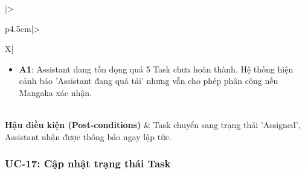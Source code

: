 \begin{table}[H]
\begin{tabularx}{\textwidth}{|>{\raggedright\arraybackslash\bfseries}p{4.5cm}|>{\raggedright\arraybackslash}X|}
\begin{minipage}[t]{\linewidth}
\begin{itemize}[leftmargin=*]
        \item \textbf{A1}: Assistant đang tồn đọng quá 5 Task chưa hoàn thành. Hệ thống hiện cảnh báo 'Assistant đang quá tải' nhưng vẫn cho phép phân công nếu Mangaka xác nhận.
    \end{itemize}
\end{minipage} \\ \hline
\textbf{Hậu điều kiện (Post-conditions)} & Task chuyển sang trạng thái 'Assigned', Assistant nhận được thông báo ngay lập tức. \\ \hline
\end{tabularx}
\caption{Đặc tả UC-16: Tạo và phân công Task}
\label{tab:uc16}
\end{table}

\subsubsection{UC-17: Cập nhật trạng thái Task}\label{subsubsec:uc17_update_task}
